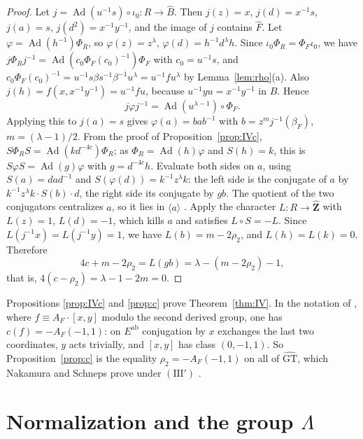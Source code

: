 \documentclass[11pt,a4paper]{article}
\theoremstyle{plain}
\theoremstyle{definition}
\theoremstyle{remark}
\newcommand{\GT}{\widehat{\mathrm{GT}}}
\newcommand{\Zh}{\widehat{\mathbf Z}}
\newcommand{\Fh}{\widehat F}
\newcommand{\Bh}{\widehat B}
\newcommand{\Ad}{\operatorname{Ad}}
\newcommand{\ab}{\mathrm{ab}}
\begin{document}
\begin{proof}
Let $j=\Ad(u^{-1}s)\circ\iota_0:R\to\Bh$. Then $j(z)=x$, $j(d)=x^{-1}s$, $j(a)=s$, $j(d^2)=x^{-1}y^{-1}$, and the
image of $j$ contains $\Fh$. Let $\varphi=\Ad(h^{-1})\Phi_R$, so $\varphi(z)=z^\lambda$,
$\varphi(d)=h^{-1}d^\lambda h$. Since $\iota_0\Phi_R=\Phi_F\iota_0$, we have
$j\Phi_Rj^{-1}=\Ad(c_0\Phi_F(c_0)^{-1})\Phi_F$ with $c_0=u^{-1}s$, and
$c_0\Phi_F(c_0)^{-1}=u^{-1}s\beta s^{-1}\beta^{-1}u^{\lambda}=u^{-1}fu^\lambda$ by Lemma~\ref{lem:rho}(a). Also
$j(h)=f(x,x^{-1}y^{-1})=u^{-1}fu$, because $u^{-1}yu=x^{-1}y^{-1}$ in $B$. Hence
\[
 j\varphi j^{-1}=\Ad(u^{\lambda-1})\circ\Phi_F .
\]
Applying this to $j(a)=s$ gives $\varphi(a)=bab^{-1}$ with $b=z^{m}j^{-1}(\beta_F)$, $m=(\lambda-1)/2$.
From the proof of Proposition~\ref{prop:IVc}, $S\Phi_RS=\Ad(kd^{-4c})\Phi_R$; as $\Phi_R=\Ad(h)\varphi$ and
$S(h)=k$, this is $S\varphi S=\Ad(g)\varphi$ with $g=d^{-4c}h$. Evaluate both sides on $a$, using $S(a)=dad^{-1}$
and $S(\varphi(d))=k^{-1}z^\lambda k$: the left side is the conjugate of $a$ by
$k^{-1}z^\lambda k\cdot S(b)\cdot d$, the right side its conjugate by $gb$. The quotient of the two conjugators
centralizes $a$, so it lies in $\langle a\rangle$ \cite{HR}. Apply the character $L:R\to\Zh$ with $L(z)=1$,
$L(d)=-1$, which kills $a$ and satisfies $L\circ S=-L$. Since $L(j^{-1}x)=L(j^{-1}y)=1$, we have
$L(b)=m-2\rho_2$, and $L(h)=L(k)=0$. Therefore
\[
 4c+m-2\rho_2=L(gb)=\lambda-(m-2\rho_2)-1,
\]
that is, $4(c-\rho_2)=\lambda-1-2m=0$.
\end{proof}

Propositions \ref{prop:IVc} and \ref{prop:c} prove Theorem~\ref{thm:IV}. In the notation of \cite[(5.2)]{NS},
where $f\equiv A_F\cdot[x,y]$ modulo the second derived group, one has $c(f)=-A_F(-1,1)$: on $E^{\ab}$ conjugation
by $x$ exchanges the last two coordinates, $y$ acts trivially, and $[x,y]$ has class $(0,-1,1)$. So
Proposition~\ref{prop:c} is the equality $\rho_2=-A_F(-1,1)$ on all of $\GT$, which Nakamura and Schneps prove
under $(\mathrm{III}')$ \cite[Proposition 5.3]{NS}.

\section{Normalization and the group \texorpdfstring{$\Lambda$}{Lambda}}\label{sec:Lambda}
\end{document}
